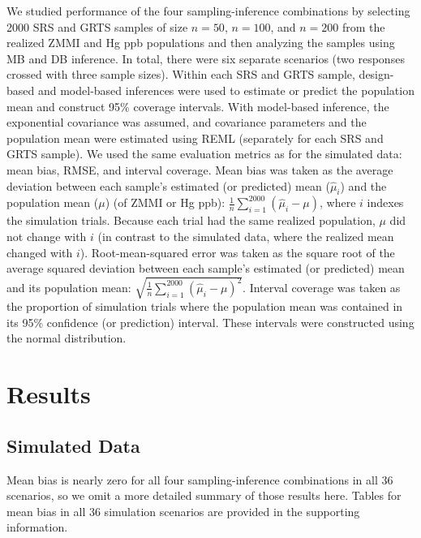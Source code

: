 \documentclass[]{elsarticle} %
\begin{document}
We studied performance of the four sampling-inference combinations by
selecting 2000 SRS and GRTS samples of size \(n = 50\), \(n = 100\), and
\(n = 200\) from the realized ZMMI and Hg ppb populations and then
analyzing the samples using MB and DB inference. In total, there were
six separate scenarios (two responses crossed with three sample sizes).
Within each SRS and GRTS sample, design-based and model-based inferences
were used to estimate or predict the population mean and construct 95\%
coverage intervals. With model-based inference, the exponential
covariance was assumed, and covariance parameters and the population
mean were estimated using REML (separately for each SRS and GRTS
sample). We used the same evaluation metrics as for the simulated data:
mean bias, RMSE, and interval coverage. Mean bias was taken as the
average deviation between each sample's estimated (or predicted) mean
(\(\hat{\mu}_i\)) and the population mean (\(\mu\)) (of ZMMI or Hg ppb):
\(\frac{1}{n}\sum_{i = 1}^{2000} (\hat{\mu}_i - \mu)\), where \(i\)
indexes the simulation trials. Because each trial had the same realized
population, \(\mu\) did not change with \(i\) (in contrast to the
simulated data, where the realized mean changed with \(i\)).
Root-mean-squared error was taken as the square root of the average
squared deviation between each sample's estimated (or predicted) mean
and its population mean:
\(\sqrt{\frac{1}{n}\sum_{i = 1}^{2000} (\hat{\mu}_i - \mu)^2}\).
Interval coverage was taken as the proportion of simulation trials where
the population mean was contained in its 95\% confidence (or prediction)
interval. These intervals were constructed using the normal
distribution.

\hypertarget{sec:results}{%
\section{Results}\label{sec:results}}

\hypertarget{sec:r_sim}{%
\subsection{Simulated Data}\label{sec:r_sim}}

Mean bias is nearly zero for all four sampling-inference combinations in
all 36 scenarios, so we omit a more detailed summary of those results
here. Tables for mean bias in all 36 simulation scenarios are provided
in the supporting information.
\end{document}
